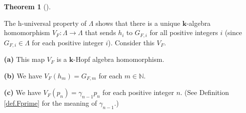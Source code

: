 \documentclass[numbers=enddot,12pt,final,onecolumn,notitlepage]{scrartcl}%
\theoremstyle{definition}
\newtheorem{theo}{Theorem}[section]
\newenvironment{theorem}[1][]
{\begin{theo}[#1]\begin{leftbar}}
{\end{leftbar}\end{theo}}
\begin{document}
\begin{theorem}
\label{thm.VF.main}The h-universal property of $\Lambda$ shows that there is a
unique $\mathbf{k}$-algebra homomorphism $V_{F}:\Lambda\rightarrow\Lambda$
that sends $h_{i}$ to $G_{F,i}$ for all positive integers $i$ (since
$G_{F,i}\in\Lambda$ for each positive integer $i$). Consider this $V_{F}$.

\textbf{(a)} This map $V_{F}$ is a $\mathbf{k}$-Hopf algebra homomorphism.

\textbf{(b)} We have $V_{F}\left(  h_{m}\right)  =G_{F,m}$ for each
$m\in\mathbb{N}$.

\textbf{(c)} We have $V_{F}\left(  p_{n}\right)  =\gamma_{n-1}p_{n}$ for each
positive integer $n$. (See Definition \ref{def.Fprime} for the meaning of
$\gamma_{n-1}$.)
\end{theorem}
\end{document}
